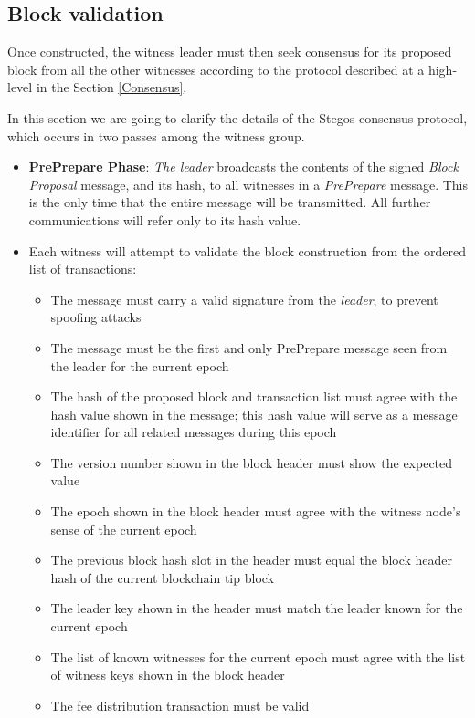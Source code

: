 \documentclass[8pt,fleqn,openany]{book}
\begin{document}
\subsection{Block validation} Once constructed, the witness leader must then seek consensus for its proposed block from all the other witnesses according to the protocol described at a high-level in the Section \ref{Consensus}. 

In this section we are going to clarify the details of the Stegos consensus protocol, which occurs in two passes among the witness group.

\begin{itemize}
  \item {\textbf{PrePrepare Phase}: \textit{The leader} broadcasts the contents of the signed \textit{Block Proposal} message, and its hash, to all witnesses in a \textit{PrePrepare} message. This is the only time that the entire message will be transmitted. All further communications will refer only to its hash value.}
  \item {Each witness will attempt to validate the block construction from the ordered list of transactions:
    \begin{itemize}
      \item {The message must carry a valid signature from the \textit{leader}, to prevent spoofing attacks}
      \item {The message must be the first and only PrePrepare message seen from the leader for the current epoch}
      \item {The hash of the proposed block and transaction list must agree with the hash value shown in the message; this hash value will serve as a message identifier for all related messages during this epoch}
      \item {The version number shown in the block header must show the expected value}
      \item {The epoch shown in the block header must agree with the witness node’s sense of the current epoch}
      \item {The previous block hash slot in the header must equal the block header hash of the current blockchain tip block}
      \item {The leader key shown in the header must match the leader known for the current epoch}
      \item {The list of known witnesses for the current epoch must agree with the list of witness keys shown in the block header}
      \item {The fee distribution transaction must be valid}

\end{itemize}}
\end{itemize}
\end{document}
